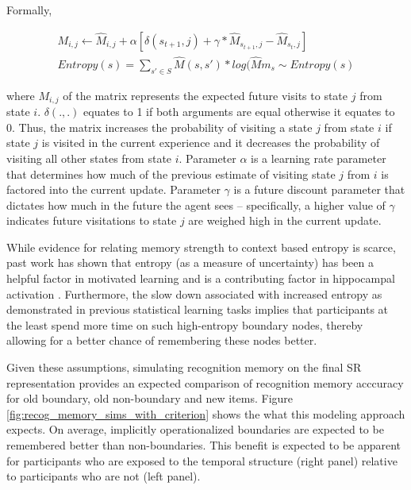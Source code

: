 Formally,

\begin{equation}
    \begin{aligned}
        M_{i,j} \leftarrow \hat{M}_{i,j} + \alpha[\delta(s_{t+1},j) + \gamma*\hat{M}_{s_{t+1},j} - \hat{M}_{s_t,j}] \\ 
        Entropy(s) = \sum_{s' \in S} \hat{M}(s, s') * log(\hat{M}
        m_s \sim Entropy(s) 
    \end{aligned}
\end{equation}

where $M_{i,j}$ of the matrix represents the expected future visits to state $j$ from state $i$. $\delta(., .)$ equates to 1 if both arguments are equal otherwise it equates to 0. Thus, the matrix increases the probability of visiting a state $j$ from state $i$ if state $j$ is visited in the current experience and it decreases the probability of visiting all other states from state $i$. Parameter $\alpha$ is a learning rate parameter that determines how much of the previous estimate of visiting state $j$ from $i$ is factored into the current update. Parameter $\gamma$ is a future discount parameter that dictates how much in the future the agent sees -- specifically, a higher value of $\gamma$ indicates future visitations to state $j$ are weighed high in the current update.

While evidence for relating memory strength to context based entropy is scarce, past work has shown that entropy (as a measure of uncertainty) has been a helpful factor in motivated learning and is a contributing factor in hippocampal activation \cite{davis2012striatal}. Furthermore, the slow down associated with increased entropy as demonstrated in previous statistical learning tasks \cite{lynn2020abstract,lynn2020human,lynn2020humans} implies that participants at the least spend more time on such high-entropy boundary nodes, thereby allowing for a better chance of remembering these nodes better. 

Given these assumptions, simulating recognition memory on the final SR representation provides an expected comparison of recognition memory acccuracy for old boundary, old non-boundary and new items. Figure \ref{fig:recog_memory_sims_with_criterion} shows the what this modeling approach expects. On average, implicitly operationalized boundaries are expected to be remembered better than non-boundaries. This benefit is expected to be apparent for participants who are exposed to the temporal structure (right panel) relative to participants who are not (left panel).

